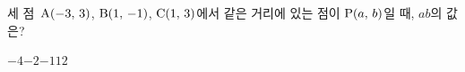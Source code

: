 세 점~$\mathrm{A}(-3,\,3)$, $\mathrm{B}(1,\,-1)$, $\mathrm{C}(1,\,3)$에서 같은 거리에 있는 점이 $\mathrm{P}(a,\,b)$일 때, $ab$의 값은?
\begin{choices32}{$-4$}{$-2$}{$-1$}{$1$}{$2$}\end{choices32}
